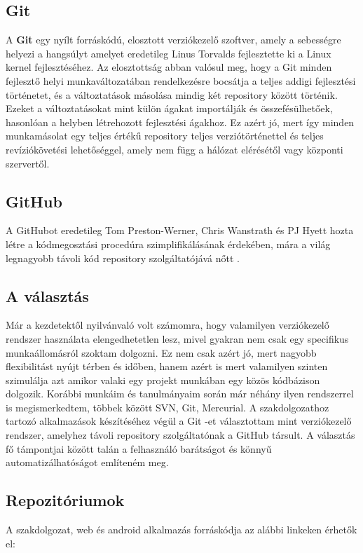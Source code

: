 \documentclass[12pt]{report}
\theoremstyle{definition}
\begin{document}
	\subsection{Git}
	A \textbf{Git} egy nyílt forráskódú, elosztott verziókezelő szoftver, amely a sebességre helyezi a hangsúlyt amelyet eredetileg Linus Torvalds fejlesztette ki a Linux kernel fejlesztéséhez. Az elosztottság abban valósul meg, hogy a Git minden fejlesztő helyi munkaváltozatában rendelkezésre bocsátja a teljes addigi fejlesztési történetet, és a változtatások másolása mindig két repository között történik. Ezeket a változtatásokat mint külön ágakat importálják és összefésülhetőek, hasonlóan a helyben létrehozott fejlesztési ágakhoz. Ez azért jó, mert így minden munkamásolat egy teljes értékű repository teljes verziótörténettel és teljes revíziókövetési lehetőséggel, amely nem függ a hálózat elérésétől vagy központi szervertől.
	
	\subsection{GitHub}
	A GitHubot eredetileg Tom Preston-Werner, Chris Wanstrath és PJ Hyett hozta létre a kódmegosztási procedúra szimplifikálásának érdekében, mára a világ legnagyobb távoli kód repository szolgáltatójává nőtt \cite{Github}.
	
	\subsection{A választás} Már a kezdetektől nyilvánvaló volt számomra, hogy valamilyen verziókezelő rendszer használata elengedhetetlen lesz, mivel gyakran nem csak egy specifikus munkaállomásról szoktam dolgozni. Ez nem csak azért jó, mert nagyobb flexibilitást nyújt térben és időben, hanem azért is mert valamilyen szinten szimulálja azt amikor valaki egy projekt munkában egy közös kódbázison dolgozik. Korábbi munkáim és tanulmányaim során már néhány ilyen rendszerrel is megismerkedtem, többek között SVN, Git, Mercurial. A szakdolgozathoz tartozó alkalmazások készítéséhez végül a Git -et választottam mint verziókezelő rendszer, amelyhez távoli repository szolgáltatónak a GitHub társult. A választás fő támpontjai között talán a felhasználó barátságot és könnyű automatizálhatóságot említeném meg. 
	
	\subsection{Repozitóriumok}
	A szakdolgozat, web és android alkalmazás forráskódja az alábbi linkeken érhetők el:
	
\end{document}
